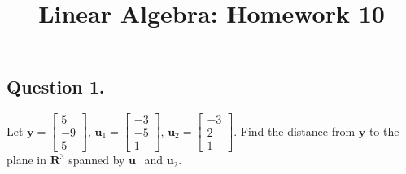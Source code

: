 \documentclass{article}
\title{Linear Algebra: Homework 10}
\begin{document}
\maketitle
\subsection*{Question 1.}
Let $\mathbf{y}=\left[\begin{array}{r}5\\-9\\5\end{array}\right]$, $\mathbf{u}_1=\left[\begin{array}{r}-3\\-5\\1\end{array}\right]$, $\mathbf{u}_2=\left[\begin{array}{r}-3\\2\\1\end{array}\right]$. Find the distance from $\mathbf{y}$ to the plane in $\mathbf{R}^3$ spanned by $\mathbf{u}_1$ and $\mathbf{u}_2$.
\end{document}

